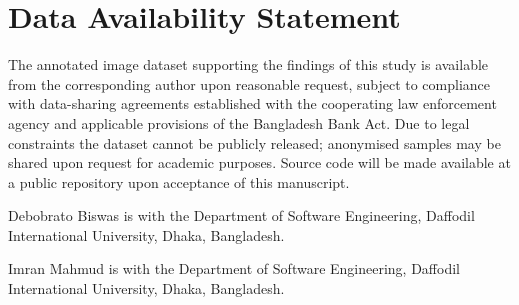 \documentclass[journal]{IEEEtran}
\begin{document}
\section*{Data Availability Statement}
The annotated image dataset supporting the findings of this study is available from the corresponding author upon reasonable request, subject to compliance with data-sharing agreements established with the cooperating law enforcement agency and applicable provisions of the Bangladesh Bank Act. Due to legal constraints the dataset cannot be publicly released; anonymised samples may be shared upon request for academic purposes. Source code will be made available at a public repository upon acceptance of this manuscript.




\begin{IEEEbiographynophoto}{Debobrato Biswas}
is with the Department of Software Engineering, Daffodil International University, Dhaka, Bangladesh.
\end{IEEEbiographynophoto}

\begin{IEEEbiographynophoto}{Imran Mahmud}
is with the Department of Software Engineering, Daffodil International University, Dhaka, Bangladesh.
\end{IEEEbiographynophoto}
\end{document}
